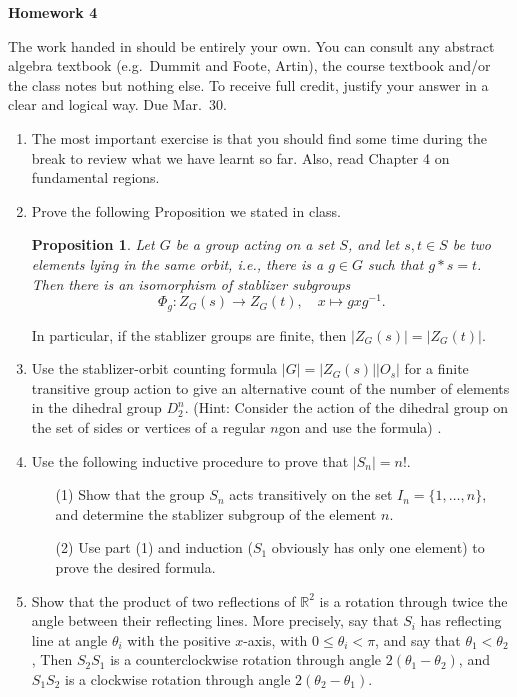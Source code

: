 \documentclass[12pt]{article}
\title{}
\date{}
\theoremstyle{plain}
\newtheorem{prop}[thm]{Proposition}
\theoremstyle{definition}
\theoremstyle{remark}
\newcommand{\R}{\mathbb{R}}
\newcommand{\lra}{\longrightarrow}
\begin{document}
\begin{center}
{\Large \bf Homework 4}
\end{center}
The work handed in should be entirely your own. You can consult any abstract algebra textbook (e.g.~Dummit and Foote, Artin), the course textbook and/or the class notes but nothing else. To receive full credit, justify your answer in a clear and logical way. Due Mar.~30.

\begin{enumerate}
\item The most important exercise is that you should find some time during the break to review what we have learnt so far. Also, read Chapter 4 on fundamental regions.

\item Prove the following Proposition we stated in class.
\begin{prop}
Let $G$ be a group acting on a set $S$, and let $s,t\in S$ be two elements lying in the same orbit, i.e., there is a $g\in G$ such that $g*s=t$. Then there is an isomorphism of stablizer subgroups
\[
\Phi_g: Z_G(s)\lra Z_G(t),\quad x\mapsto gxg^{-1}.
\]
\end{prop}
In particular, if the stablizer groups are finite, then $|Z_G(s)|=|Z_G(t)|$.

\item Use the stablizer-orbit counting formula $|G|=|Z_G(s)||O_{s}|$ for a finite transitive group action to give an alternative count of the number of elements in the dihedral group $D_2^n$. (Hint: Consider the action of the dihedral group on the set of sides or vertices of a regular $n$gon and use the formula)
.
\item Use the following inductive procedure to prove that $|S_n|=n!$.
\begin{enumerate}
\item[(1)] Show that the group $S_n$ acts transitively on the set $I_n=\{1,\dots, n\}$, and determine the stablizer subgroup of the element $n$.
\item[(2)] Use part (1) and induction ($S_1$ obviously has only one element) to prove the desired formula.
\end{enumerate}

\item Show that the product of two reflections of $\R^2$ is a rotation through
twice the angle between their reflecting lines. More precisely,
say that $S_i$ has reflecting line at angle $\theta_i$ with the positive $x$-axis,
with $0 \leq \theta_i< \pi$, and say that $\theta_1<\theta_2$, Then $S_2S_1$ is a counterclockwise
rotation through angle $2(\theta_1-\theta_2)$, and $S_1S_2$ is a clockwise
rotation through angle $2(\theta_2 - \theta_1)$.

\end{enumerate}
\end{document}
